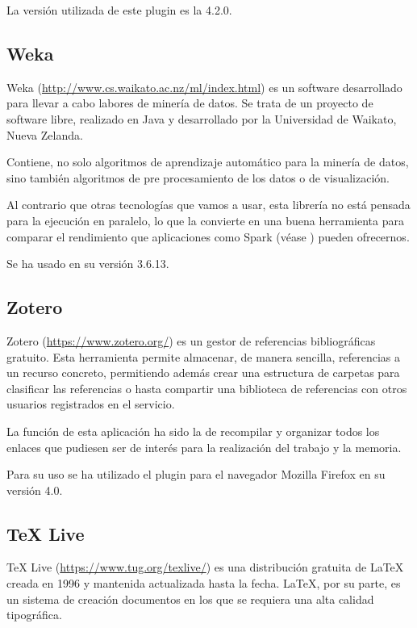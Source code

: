 La versión utilizada de este plugin es la 4.2.0.


\subsection{Weka}\label{sec:DefWeka}
Weka (\url{http://www.cs.waikato.ac.nz/ml/index.html}) es un software desarrollado para llevar a cabo labores de minería de datos. Se trata de un proyecto de software libre, realizado en Java y desarrollado por la Universidad de Waikato, Nueva Zelanda.

Contiene, no solo algoritmos de aprendizaje automático para la minería de datos, sino también algoritmos de pre procesamiento de los datos o de visualización.

Al contrario que otras tecnologías que vamos a usar, esta librería no está pensada para la ejecución en paralelo, lo que la convierte en una buena herramienta para comparar el rendimiento que aplicaciones como Spark (véase ) pueden ofrecernos.

Se ha usado en su versión 3.6.13.




\subsection{Zotero}
Zotero (\url{https://www.zotero.org/}) es un gestor de referencias bibliográficas gratuito. Esta herramienta permite almacenar, de manera sencilla, referencias a un recurso concreto, permitiendo además crear una estructura de carpetas para clasificar las referencias o hasta compartir una biblioteca de referencias con otros usuarios registrados en el servicio.

La función de esta aplicación ha sido la de recompilar y organizar todos los enlaces que pudiesen ser de interés para la realización del trabajo y la memoria.

Para su uso se ha utilizado el plugin para el navegador Mozilla Firefox en su versión 4.0.

\subsection{TeX Live}
TeX Live (\url{https://www.tug.org/texlive/}) es una distribución gratuita de LaTeX creada en 1996 y mantenida actualizada hasta la fecha. LaTeX, por su parte, es un sistema de creación documentos en los que se requiera una alta calidad tipográfica.

